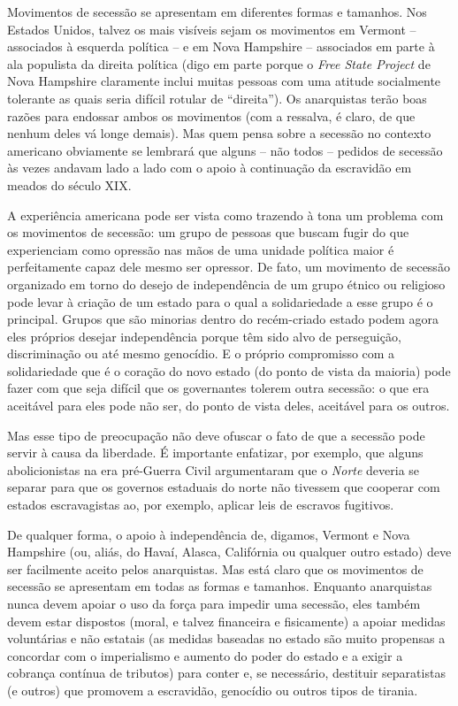 Movimentos de secessão se apresentam em diferentes formas e tamanhos. Nos Estados Unidos, talvez os mais visíveis sejam os movimentos em Vermont -- associados à esquerda política -- e em Nova Hampshire -- associados em parte à ala populista da direita política (digo em parte porque o \emph{Free State Project} de Nova Hampshire claramente inclui muitas pessoas com uma atitude socialmente tolerante as quais seria difícil rotular de ``direita''). Os anarquistas terão boas razões para endossar ambos os movimentos (com a ressalva, é claro, de que nenhum deles vá longe demais). Mas quem pensa sobre a secessão no contexto americano obviamente se lembrará que alguns -- não todos -- pedidos de secessão às vezes andavam lado a lado com o apoio à continuação da escravidão em meados do século XIX.

A experiência americana pode ser vista como trazendo à tona um problema com os movimentos de secessão: um grupo de pessoas que buscam fugir do que experienciam como opressão nas mãos de uma unidade política maior é perfeitamente capaz dele mesmo ser opressor. De fato, um movimento de secessão organizado em torno do desejo de independência de um grupo étnico ou religioso pode levar à criação de um estado para o qual a solidariedade a esse grupo é o principal. Grupos que são minorias dentro do recém-criado estado podem agora eles próprios desejar independência porque têm sido alvo de perseguição, discriminação ou até mesmo genocídio. E o próprio compromisso com a solidariedade que é o coração do novo estado (do ponto de vista da maioria) pode fazer com que seja difícil que os governantes tolerem outra secessão: o que era aceitável para eles pode não ser, do ponto de vista deles, aceitável para os outros.

Mas esse tipo de preocupação não deve ofuscar o fato de que a secessão pode servir à causa da liberdade. É importante enfatizar, por exemplo, que alguns abolicionistas na era pré-Guerra Civil argumentaram que o \emph{Norte} deveria se separar para que os governos estaduais do norte não tivessem que cooperar com estados escravagistas ao, por exemplo, aplicar leis de escravos fugitivos.

De qualquer forma, o apoio à independência de, digamos, Vermont e Nova Hampshire (ou, aliás, do Havaí, Alasca, Califórnia ou qualquer outro estado) deve ser facilmente aceito pelos anarquistas. Mas está claro que os movimentos de secessão se apresentam em todas as formas e tamanhos. Enquanto anarquistas nunca devem apoiar o uso da força para impedir uma secessão, eles também devem estar dispostos (moral, e talvez financeira e fisicamente) a apoiar medidas voluntárias e não estatais (as medidas baseadas no estado são muito propensas a concordar com o imperialismo e aumento do poder do estado e a exigir a cobrança contínua de tributos) para conter e, se necessário, destituir separatistas (e outros) que promovem a escravidão, genocídio ou outros tipos de tirania.

